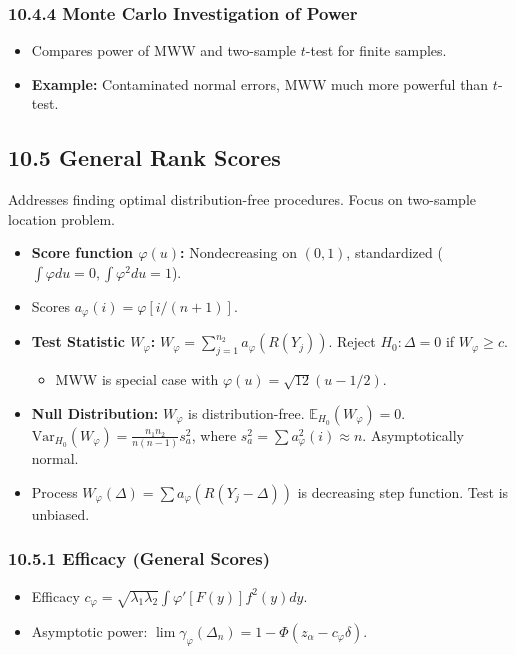 \subsubsection{10.4.4 Monte Carlo Investigation of Power}

\begin{itemize}
	\item Compares power of MWW and two-sample $t$-test for finite samples.
	\item \textbf{Example:} Contaminated normal errors, MWW much more powerful than $t$-test.
\end{itemize}

\subsection{10.5 General Rank Scores}

Addresses finding optimal distribution-free procedures. Focus on two-sample location problem.

\begin{itemize}
	\item \textbf{Score function $\varphi(u)$:} Nondecreasing on $(0,1)$, standardized ($\int\varphi du=0, \int\varphi^2 du=1$).
	\item Scores $a_\varphi(i) = \varphi[i/(n+1)]$.
	\item \textbf{Test Statistic $W_\varphi$:} $W_\varphi = \sum_{j=1}^{n_2} a_\varphi(R(Y_j))$. Reject $H_0: \Delta=0$ if $W_\varphi \ge c$.
	\begin{itemize}
		\item MWW is special case with $\varphi(u)=\sqrt{12}(u-1/2)$.
	\end{itemize}
	\item \textbf{Null Distribution:} $W_\varphi$ is distribution-free. $\mathbb{E}_{H_0}(W_\varphi)=0$. $\text{Var}_{H_0}(W_\varphi) = \frac{n_1n_2}{n(n-1)}s_a^2$, where $s_a^2 = \sum a_\varphi^2(i) \approx n$. Asymptotically normal.
	\item Process $W_\varphi(\Delta) = \sum a_\varphi(R(Y_j-\Delta))$ is decreasing step function. Test is unbiased.
\end{itemize}

\subsubsection{10.5.1 Efficacy (General Scores)}

\begin{itemize}
	\item Efficacy $c_\varphi = \sqrt{\lambda_1\lambda_2} \int \varphi'[F(y)]f^2(y)dy$.
	\item Asymptotic power: $\lim \gamma_\varphi(\Delta_n) = 1 - \Phi(z_\alpha - c_\varphi \delta)$.
\end{itemize}


